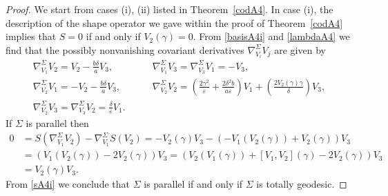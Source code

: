 \documentclass{amsart}
\theoremstyle{plain}
\theoremstyle{remark}
\begin{document}
{\begin{proof}
We start from cases (i), (ii) listed in Theorem~\ref{codA4}. In case (i), the description of the shape operator we gave within the proof of Theorem~\ref{codA4} implies that $S=0$ if and only if $V_2(\gamma)=0$. From \eqref{basisA4i} and \eqref{lambdaA4} we find that the possibly nonvanishing covariant derivatives $\nabla^\Sigma _{V_i} V_j$ are given by
%
$$%
\begin{array}{ll}
\nabla^\Sigma _{V_1} V_2 = V_2 -\frac{b\delta}{a}V_3, \qquad &
\nabla^\Sigma _{V_1} V_3 = \nabla^\Sigma _{V_3} V_1 = -V_3 , \\[6 pt]
\nabla^\Sigma _{V_2} V_1 = -V_2 - \frac{b\delta}{a}V_3,\qquad &
\nabla^\Sigma _{V_2} V_2 = \left(\frac{2\gamma^2}{\varepsilon} + \frac{2 \delta^2 b}{a\varepsilon}\right)	V_1 + \left(\frac{2V_2(\gamma)\gamma}{\delta}\right)V_3, \\[6 pt]
\nabla^\Sigma _{V_2} V_3 = \nabla^\Sigma _{V_3} V_2= \frac{\delta}{\varepsilon}V_1. \qquad &
\end{array}
$$%
%
If $\Sigma$ is parallel then
\begin{align*}
0 &= S(\nabla^\Sigma_{V_1}V_2) - \nabla^\Sigma_{V_1}S(V_2)= -V_2(\gamma)V_3 - (-V_1(V_2(\gamma)) +V_2(\gamma))V_3\\
  &= (V_1(V_2(\gamma))-2V_2(\gamma))V_3 = (V_2(V_1(\gamma)) + [V_1,V_2](\gamma) - 2V_2(\gamma))V_3\\
  &=V_2(\gamma)V_3.
\end{align*}
From \eqref{sA4i} we conclude that $\Sigma$ is parallel if and only if $\Sigma$ is totally geodesic.


\end{proof}}
\end{document}
